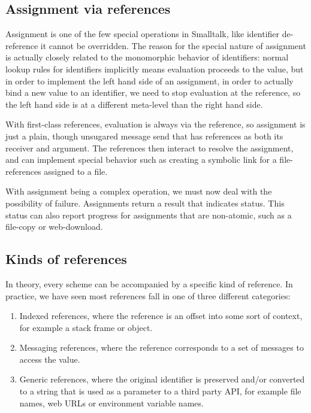 \documentclass[preprint,authoryear]{llncs}
\begin{document}
\subsection{Assignment via references}

Assignment is one of the few special operations in Smalltalk, like identifier de-reference it cannot be overridden.
The reason for the special nature of assignment is actually closely related to the monomorphic behavior
of identifiers:  normal lookup rules for identifiers implicitly means evaluation proceeds to the value, but in order to implement the left
hand side of an assignment, in order to actually bind a new value to an identifier, we need to stop evaluation
at the reference, so the left hand side is at a different meta-level than the right hand side\cite{kay-assignment}.

With first-class references, evaluation is always via the reference, so assignment is just a plain, though unsugared
message send that has references as both its receiver and argument.  The references then interact to resolve
the assignment, and can implement special behavior such as creating a symbolic link for a file-references assigned
to a file.

With assignment being a complex operation, we must now deal with the possibility of failure.  Assignments 
return a result that indicates status.  This status can also report progress for assignments that are
non-atomic, such as a file-copy or web-download.



\subsection{Kinds of references}
\label{refkinds}
In theory, every scheme can be accompanied by a specific kind of reference.  In practice, we have 
seen most references fall in one of three different categories:

\begin{enumerate}
\item Indexed references, where the reference is an offset into some sort of context, for
	example a stack frame or object.
\item Messaging references, where the reference corresponds to a set of messages to
	access the value.
\item Generic references, where the original identifier is preserved and/or converted to
	a string that is used as a parameter to a third party API, for example file names,
	web URLs or environment variable names.
\end{enumerate}
\end{document}
